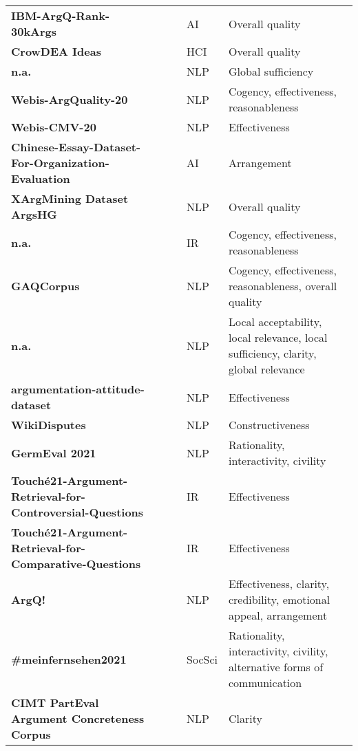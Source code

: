 {\begin{longtable}{P{4.1cm}P{1.9cm}P{3cm}P{1cm}p{4cm}}
\textbf{IBM-ArgQ-Rank-30kArgs} && \citet{Gretz_Friedman_Cohen-Karlik_Toledo_Lahav_Aharonov_Slonim_2020} & AI & Overall quality\\
\textbf{CrowDEA Ideas} && \citet{Baba_Li_Kashima_2020} & HCI & Overall quality\\
\textbf{n.a.} && \citet{jo-etal-2020-detecting} & NLP & Global sufficiency\\
\textbf{Webis-ArgQuality-20} && \citet{gienapp-etal-2020-efficient} & NLP & Cogency, effectiveness, reasonableness\\
\textbf{Webis-CMV-20} && \citet{al-khatib-etal-2020-exploiting} & NLP & Effectiveness\\
\textbf{Chinese-Essay-Dataset-For-Organization-Evaluation} && \citet{ijcai2020p536} & AI & Arrangement\\
\textbf{XArgMining Dataset ArgsHG} && \citet{toledo-ronen-etal-2020-multilingual} & NLP & Overall quality\\
\textbf{n.a.} && \citet{dumani2020ranking} & IR & Cogency, effectiveness, reasonableness\\
\textbf{GAQCorpus} && \citet{lauscher-etal-2020-rhetoric} & NLP & Cogency, effectiveness, reasonableness, overall quality\\
\textbf{n.a.} && \citet{sahai-etal-2021-breaking} & NLP & Local acceptability, local relevance, local sufficiency, clarity, global relevance\\
\textbf{argumentation-attitude-dataset} && \citet{brenneis-etal-2021-will} & NLP & Effectiveness\\
\textbf{WikiDisputes} && \citet{de-kock-vlachos-2021-beg} & NLP & Constructiveness\\
\textbf{GermEval 2021} && \citet{risch-etal-2021-overview} & NLP & Rationality, interactivity, civility\\
\textbf{Touché21-Argument-Retrieval-for-Controversial-Questions} && \citet{bondarenko2021touche} & IR & Effectiveness\\
\textbf{Touché21-Argument-Retrieval-for-Comparative-Questions} && \citet{bondarenko2021touche} & IR & Effectiveness\\
\textbf{ArgQ!} && \citet{silva2021quality} & NLP & Effectiveness, clarity, credibility, emotional appeal, arrangement\\
\textbf{\#meinfernsehen2021} && \citet{2022:gerlach:meinferns} & SocSci & Rationality, interactivity, civility, alternative forms of communication\\
\textbf{CIMT PartEval Argument Concreteness Corpus} && \citet{romberg-etal-2022-corpus} & NLP & Clarity\\

\end{longtable}}
